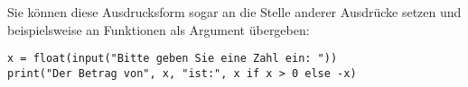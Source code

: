 Sie können diese Ausdrucksform sogar an die Stelle anderer Ausdrücke setzen und beispielsweise an Funktionen als Argument übergeben:

\begin{codebox}
\begin{verbatim}
x = float(input("Bitte geben Sie eine Zahl ein: "))
print("Der Betrag von", x, "ist:", x if x > 0 else -x)
\end{verbatim}
\end{codebox}